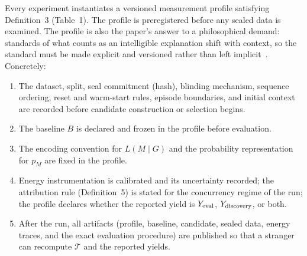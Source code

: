 \documentclass[11pt]{article}
\begin{document}
Every experiment instantiates a versioned measurement profile satisfying Definition~3 (Table~1). The profile is preregistered before any sealed data is examined. The profile is also the paper's answer to a philosophical demand: standards of what counts as an intelligible explanation shift with context, so the standard must be made explicit and versioned rather than left implicit~\cite{deregt2005}. Concretely:
\begin{enumerate}
\item The dataset, split, seal commitment (hash), blinding mechanism, sequence ordering, reset and warm-start rules, episode boundaries, and initial context are recorded before candidate construction or selection begins.
\item The baseline \(B\) is declared and frozen in the profile before evaluation.
\item The encoding convention for \(L(M\mid G)\) and the probability representation for \(p_M\) are fixed in the profile.
\item Energy instrumentation is calibrated and its uncertainty recorded; the attribution rule (Definition~5) is stated for the concurrency regime of the run; the profile declares whether the reported yield is \(Y_{\rm eval}\), \(Y_{\rm discovery}\), or both.
\item After the run, all artifacts (profile, baseline, candidate, sealed data, energy traces, and the exact evaluation procedure) are published so that a stranger can recompute \(\mathcal{T}\) and the reported yields.
\end{enumerate}
\end{document}
